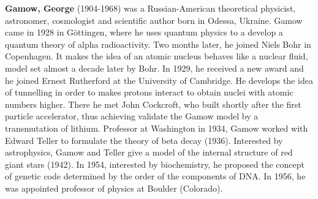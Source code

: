 \textbf{Gamow, George} (1904-1968) was a Russian-American theoretical physicist, astronomer, cosmologist and scientific author born in Odessa, Ukraine. Gamow came in 1928 in Göttingen, where he uses quantum physics to a develop a quantum theory of alpha radioactivity. Two months later, he joined Niels Bohr in Copenhagen. It makes the idea of an atomic nucleus behaves like a nuclear fluid, model set almost a decade later by Bohr. In 1929, he received a new award and he joined Ernest Rutherford at the University of Cambridge. He develops the idea of tunnelling in order to makes protons interact to obtain nuclei with atomic numbers higher. There he met John Cockcroft, who built shortly after the first particle accelerator, thus achieving validate the Gamow model by a transmutation of lithium. Professor at Washington in 1934, Gamow worked with Edward Teller to formulate the theory of beta decay (1936). Interested by astrophysics, Gamow and Teller give a model of the internal structure of red giant stars (1942). In 1954, interested by biochemistry, he proposed the concept of genetic code determined by the order of the components of DNA. In 1956, he was appointed professor of physics at Boulder (Colorado).

